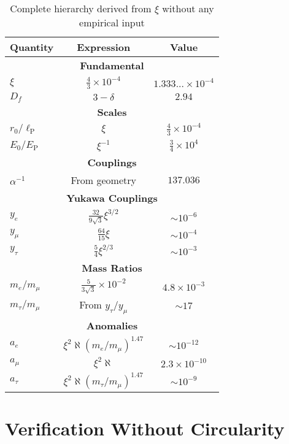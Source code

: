 \documentclass[12pt,a4paper]{article}
\newcommand{\lP}{\ell_{\text{P}}}
\newcommand{\EP}{E_{\text{P}}}
\newcommand{\rzero}{r_0}
\newcommand{\Ezero}{E_0}
\newcommand{\xipar}{\xi}  %
\begin{document}
	\begin{table}[h]
		\centering
		\begin{tabular}{lcc}
			\toprule
			\textbf{Quantity} & \textbf{Expression} & \textbf{Value} \\
			\midrule
			\multicolumn{3}{c}{\textbf{Fundamental}} \\
			$\xipar$ & $\frac{4}{3} \times 10^{-4}$ & $1.333... \times 10^{-4}$ \\
			$D_f$ & $3 - \delta$ & $2.94$ \\
			\midrule
			\multicolumn{3}{c}{\textbf{Scales}} \\
			$\rzero/\lP$ & $\xipar$ & $\frac{4}{3} \times 10^{-4}$ \\
			$\Ezero/\EP$ & $\xipar^{-1}$ & $\frac{3}{4} \times 10^{4}$ \\
			\midrule
			\multicolumn{3}{c}{\textbf{Couplings}} \\
			$\alpha^{-1}$ & From geometry & $137.036$ \\
			\midrule
			\multicolumn{3}{c}{\textbf{Yukawa Couplings}} \\
			$y_e$ & $\frac{32}{9\sqrt{3}} \xipar^{3/2}$ & $\sim 10^{-6}$ \\
			$y_\mu$ & $\frac{64}{15} \xipar$ & $\sim 10^{-4}$ \\
			$y_\tau$ & $\frac{5}{4} \xipar^{2/3}$ & $\sim 10^{-3}$ \\
			\midrule
			\multicolumn{3}{c}{\textbf{Mass Ratios}} \\
			$m_e/m_\mu$ & $\frac{5}{3\sqrt{3}} \times 10^{-2}$ & $4.8 \times 10^{-3}$ \\
			$m_\tau/m_\mu$ & From $y_\tau/y_\mu$ & $\sim 17$ \\
			\midrule
			\multicolumn{3}{c}{\textbf{Anomalies}} \\
			$a_e$ & $\xipar^2 \aleph (m_e/m_\mu)^{1.47}$ & $\sim 10^{-12}$ \\
			$a_\mu$ & $\xipar^2 \aleph$ & $2.3 \times 10^{-10}$ \\
			$a_\tau$ & $\xipar^2 \aleph (m_\tau/m_\mu)^{1.47}$ & $\sim 10^{-9}$ \\
			\bottomrule
		\end{tabular}
		\caption{Complete hierarchy derived from $\xipar$ without any empirical input}
	\end{table}
	
	\section{Verification Without Circularity}
	
\end{document}
